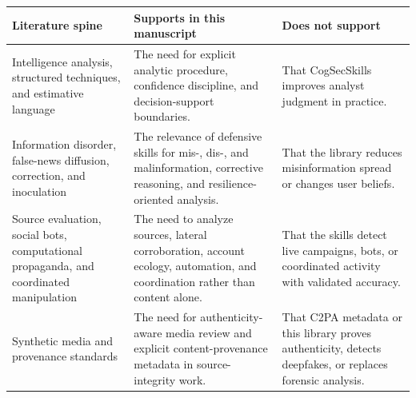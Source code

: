 \documentclass[
]{article}
\newcounter{none} %
\begin{document}
{\def\LTcaptype{none} %
\begin{longtable}[]{@{}
  >{\raggedright\arraybackslash}p{}
  >{\raggedright\arraybackslash}p{}
  >{\raggedright\arraybackslash}p{}@{}}
\toprule\noalign{}
\begin{minipage}[b]{\linewidth}\raggedright
Literature spine
\end{minipage} & \begin{minipage}[b]{\linewidth}\raggedright
Supports in this manuscript
\end{minipage} & \begin{minipage}[b]{\linewidth}\raggedright
Does not support
\end{minipage} \\
\midrule\noalign{}
\endhead
\bottomrule\noalign{}
\endlastfoot
Intelligence analysis, structured techniques, and estimative language
\citep{heuer1999psychology, heuerPherson2019structured, kent1964estimativeProbability, ukmod2023jdp200}
& The need for explicit analytic procedure, confidence discipline, and
decision-support boundaries. & That CogSecSkills improves analyst
judgment in practice. \\
Information disorder, false-news diffusion, correction, and inoculation
\citep{wardleDerakhshan2017informationDisorder, vosoughi2018spread, lewandowsky2012misinformationCorrection, roozenbeek2022inoculation, lazer2018fakeNews}
& The relevance of defensive skills for mis-, dis-, and malinformation,
corrective reasoning, and resilience-oriented analysis. & That the
library reduces misinformation spread or changes user beliefs. \\
Source evaluation, social bots, computational propaganda, and
coordinated manipulation
\citep{wineburg2019lateralReading, ferrara2016socialBots, woolleyHoward2017computationalPropaganda, bradshawHoward2019globalDisinformation}
& The need to analyze sources, lateral corroboration, account ecology,
automation, and coordination rather than content alone. & That the
skills detect live campaigns, bots, or coordinated activity with
validated accuracy. \\
Synthetic media and provenance standards
\citep{mirskyLee2021deepfakes, c2pa2026spec} & The need for
authenticity-aware media review and explicit content-provenance metadata
in source-integrity work. & That C2PA metadata or this library proves
authenticity, detects deepfakes, or replaces forensic analysis. \\

\end{longtable}}
\end{document}
